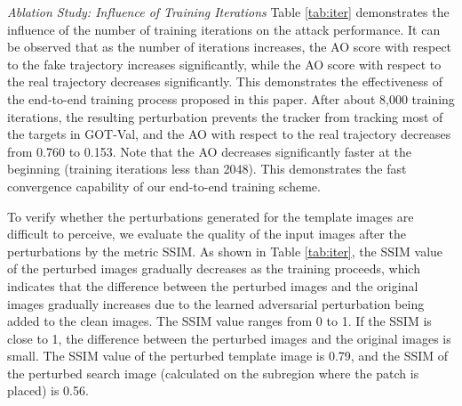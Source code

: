 \documentclass[journal]{IEEEtran}
\begin{document}
\textit{Ablation Study: Influence of Training Iterations} Table \ref{tab:iter} demonstrates the influence of the number of training iterations on the attack performance. It can be observed that as the number of iterations increases, the AO score with respect to the fake trajectory increases significantly, while the AO score with respect to the real trajectory decreases significantly. This demonstrates the effectiveness of the end-to-end training process proposed in this paper. After about 8,000 training iterations, the resulting perturbation prevents the tracker from tracking most of the targets in GOT-Val, and the AO with respect to the real trajectory decreases from 0.760 to 0.153. Note that the AO decreases significantly faster at the beginning (training iterations less than 2048). This demonstrates the fast convergence capability of our end-to-end training scheme.

To verify whether the perturbations generated for the template images are difficult to perceive, we evaluate the quality of the input images after the perturbations by the metric SSIM. As shown in Table \ref{tab:iter}, the SSIM value of the perturbed images gradually decreases as the training proceeds, which indicates that the difference between the perturbed images and the original images gradually increases due to the learned adversarial perturbation being added to the clean images. The SSIM value ranges from 0 to 1. If the SSIM is close to 1, the difference between the perturbed images and the original images is small. The SSIM value of the perturbed template image is 0.79, and the SSIM of the perturbed search image (calculated on the subregion where the patch is placed) is 0.56. 
\end{document}
